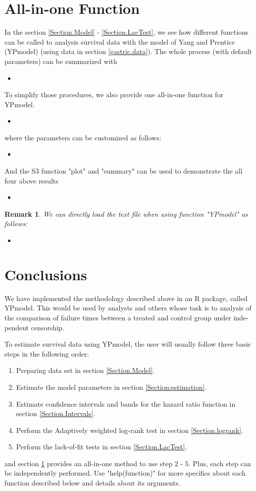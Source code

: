 \documentclass[12pt]{article}
\newcommand{\insertcode}[2]{\begin{itemize}\item[]\end{itemize}} %
\newtheorem{remark}{Remark}
\begin{document}
\section{All-in-one Function}\label{Section.All}

In the section \ref{Section.Model} - \ref{Section.LacTest}, we see how different functions can be called to analysis survival data with the model of Yang and Prentice (YPmodel) (using data in section \ref{gastric.data}). The whole process (with default parameters) can be summarized with
\insertcode{"Scripts/code25.pl"}{Summary of functions.}

To simplify those procedures, we also provide one all-in-one function for YPmodel.
\insertcode{"Scripts/code26.pl"}{All-in-one Function.}
where the parameters can be customized as follows:
\insertcode{"Scripts/code26 - 2.pl"}{All-in-one Function with customized parameters.}

And the S3 function "plot" and "summary" can be used to demonstrate the all four above results
\insertcode{"Scripts/code26 - 1.pl"}{Demonstrating the overall results.}

\begin{remark}
We can directly load the text file when using function "YPmodel" as follows:
\insertcode{"Scripts/code27.pl"}{Performing YPmodel with text files.}
\end{remark}

\section{Conclusions}\label{Section.Conclusions}
We have implemented the methodology described above in an R package, called YPmodel.
This would be used by analysts and others whose task is to analysis of the
comparison of failure times between a treated and control group under inde-
pendent censorship.

To estimate survival data using YPmodel, the user will usually follow three
basic steps in the following order:
\begin{enumerate}
  \item Preparing data set in section \ref{Section.Model}.
  \item Estimate the model parameters in section \ref{Section:estimation}.
  \item Estimate confidence intervals and bands for the hazard ratio function in section \ref{Section.Intervals}.
  \item Perform the Adaptively weighted log-rank test in section \ref{Section.logrank}.
  \item Perform the lack-of-fit tests in section \ref{Section.LacTest}.
\end{enumerate}
and section \ref{Section.All} provides an all-in-one method to use step $2$ - $5$. Plus, each step can be independently performed.
Use "help(function)" for more
specifics about each function described below and details about its arguments.
\end{document}
